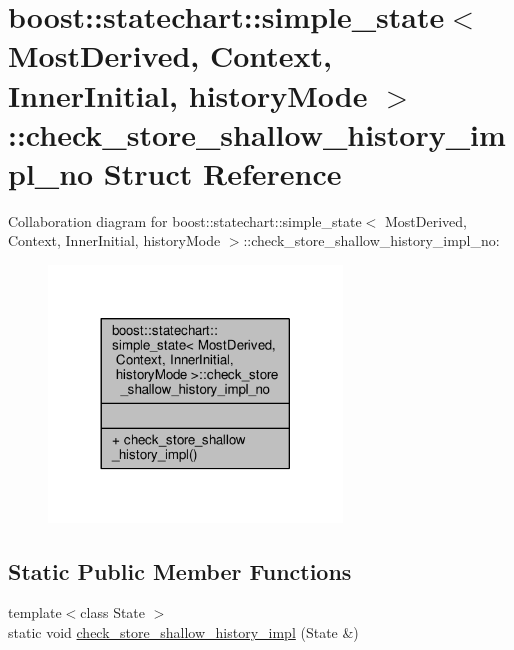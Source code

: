 \hypertarget{structboost_1_1statechart_1_1simple__state_1_1check__store__shallow__history__impl__no}{}\section{boost\+:\+:statechart\+:\+:simple\+\_\+state$<$ Most\+Derived, Context, Inner\+Initial, history\+Mode $>$\+:\+:check\+\_\+store\+\_\+shallow\+\_\+history\+\_\+impl\+\_\+no Struct Reference}
\label{structboost_1_1statechart_1_1simple__state_1_1check__store__shallow__history__impl__no}


Collaboration diagram for boost\+:\+:statechart\+:\+:simple\+\_\+state$<$ Most\+Derived, Context, Inner\+Initial, history\+Mode $>$\+:\+:check\+\_\+store\+\_\+shallow\+\_\+history\+\_\+impl\+\_\+no\+:
\nopagebreak
\begin{figure}[H]
\begin{center}
\leavevmode
\includegraphics[width=221pt]{structboost_1_1statechart_1_1simple__state_1_1check__store__shallow__history__impl__no__coll__graph}
\end{center}
\end{figure}
\subsection*{Static Public Member Functions}
\begin{DoxyCompactItemize}
\item 
{\footnotesize template$<$class State $>$ }\\static void \mbox{\hyperlink{structboost_1_1statechart_1_1simple__state_1_1check__store__shallow__history__impl__no_a599618fe58206974a3a5829a90d272ed}{check\+\_\+store\+\_\+shallow\+\_\+history\+\_\+impl}} (State \&)
\end{DoxyCompactItemize}


